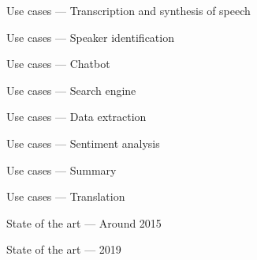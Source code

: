 
\begin{frame}{Use cases --- Transcription and synthesis of speech}
\end{frame}

\begin{frame}{Use cases --- Speaker identification}
\end{frame}

\begin{frame}{Use cases --- Chatbot}
\end{frame}

\begin{frame}{Use cases --- Search engine}
\end{frame}

\begin{frame}{Use cases --- Data extraction}
\end{frame}

\begin{frame}{Use cases --- Sentiment analysis}
\end{frame}

\begin{frame}{Use cases --- Summary}
\end{frame}

\begin{frame}{Use cases --- Translation}
  \begin{center}
  \end{center}
\end{frame}

\begin{frame}{State of the art --- Around 2015}
\end{frame}

\begin{frame}{State of the art --- 2019}
\end{frame}

